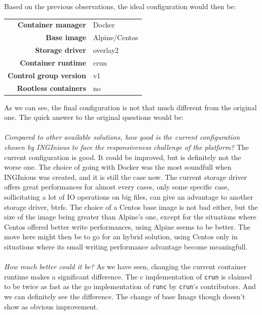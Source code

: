 Based on the previous observations, the ideal configuration would then be:

\begin{center}
\begin{tabular}{rl}
  \textbf{Container manager} & Docker \\
  \textbf{Base image} & Alpine/Centos \\
  \textbf{Storage driver} & overlay2 \\
  \textbf{Container runtime} & crun \\
  \textbf{Control group version} & v1 \\
  \textbf{Rootless containers} & no \\
\end{tabular}
\end{center}

As we can see, the final configuration is not that much different from the original one.  The quick answer to the original questions would be:
\paragraph{}\textit{Compared to other available solutions, how good is the current configuration chosen by INGInious to face the responsiveness challenge of the platform?}  The current configuration is good.  It could be improved, but is definitely not the worse one.  The choice of going with Docker was the most soundfull when INGInious was created, and it is still the case now.  The current storage driver offers great performances for almost every cases, only some specific case, sollicitating a lot of IO operations on big files, can give an advantage to another storage driver, btrfs.  The choice of a Centos base image is not bad either, but the size of the image being greater than Alpine's one, except for the situations where Centos offered better write performances, using Alpine seems to be better.  The move here might then be to go for an hybrid solution, using Centos only in situations where its small writing performance advantage become meaningfull.  
\paragraph{}\textit{How much better could it be?}  As we have seen, changing the current container runtime makes a significant difference.  The c implementation of \texttt{crun} is claimed to be twice as fast as the go implementation of \texttt{runc} by \texttt{crun}'s contributors.  And we can definitely see the difference.  The change of base Image though doesn't show as obvious improvement.
